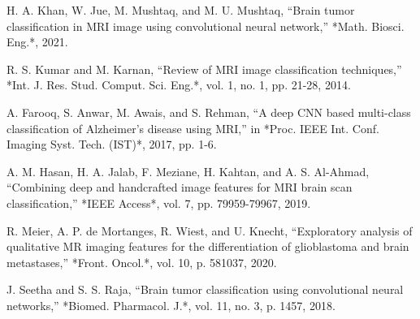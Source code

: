 \documentclass[conference]{IEEEtran}
\begin{document}
\begin{thebibliography}{00}

H. A. Khan, W. Jue, M. Mushtaq, and M. U. Mushtaq, “Brain tumor classification in MRI image using convolutional neural network,” *Math. Biosci. Eng.*, 2021. 

R. S. Kumar and M. Karnan, “Review of MRI image classification techniques,” *Int. J. Res. Stud. Comput. Sci. Eng.*, vol. 1, no. 1, pp. 21-28, 2014. 

A. Farooq, S. Anwar, M. Awais, and S. Rehman, “A deep CNN based multi-class classification of Alzheimer's disease using MRI,” in *Proc. IEEE Int. Conf. Imaging Syst. Tech. (IST)*, 2017, pp. 1-6. 

A. M. Hasan, H. A. Jalab, F. Meziane, H. Kahtan, and A. S. Al-Ahmad, “Combining deep and handcrafted image features for MRI brain scan classification,” *IEEE Access*, vol. 7, pp. 79959-79967, 2019. 

R. Meier, A. P. de Mortanges, R. Wiest, and U. Knecht, “Exploratory analysis of qualitative MR imaging features for the differentiation of glioblastoma and brain metastases,” *Front. Oncol.*, vol. 10, p. 581037, 2020.

J. Seetha and S. S. Raja, “Brain tumor classification using convolutional neural networks,” *Biomed. Pharmacol. J.*, vol. 11, no. 3, p. 1457, 2018.

\end{thebibliography}
\end{document}
